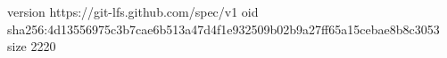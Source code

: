 version https://git-lfs.github.com/spec/v1
oid sha256:4d13556975c3b7cae6b513a47d4f1e932509b02b9a27ff65a15cebae8b8c3053
size 2220
